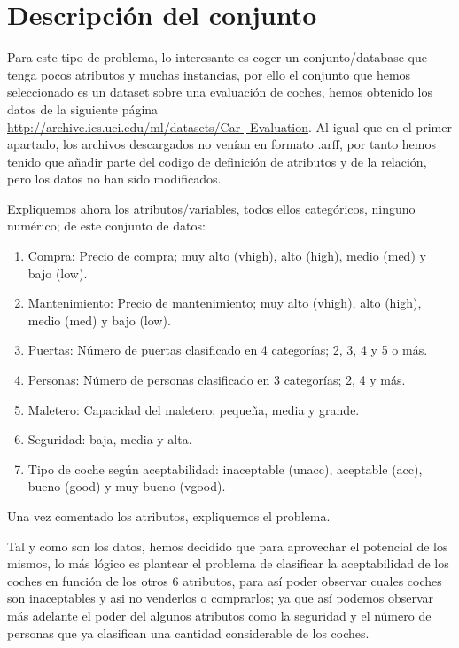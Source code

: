 \documentclass[a4paper, 11pt, twoside, openany, onecolumn, final]{memoir}
\begin{document}
		\section{Descripción del conjunto}
		Para este tipo de problema, lo interesante es coger un conjunto/database que tenga pocos atributos y muchas instancias, por ello el conjunto que hemos seleccionado es un dataset sobre una evaluación de coches, hemos obtenido los datos de la siguiente página \url{http://archive.ics.uci.edu/ml/datasets/Car+Evaluation}. Al igual que en el primer apartado, los archivos descargados no venían en formato .arff, por tanto hemos tenido que añadir parte del codigo de definición de atributos y de la relación, pero los datos no han sido modificados.
		
		Expliquemos ahora los atributos/variables, todos ellos categóricos, ninguno numérico; de este conjunto de datos:
	
	\begin{enumerate}
\item Compra: Precio de compra; muy alto (vhigh), alto (high), medio (med) y bajo (low).
\item Mantenimiento: Precio de mantenimiento; muy alto (vhigh), alto (high), medio (med) y bajo (low).
\item Puertas: Número de puertas clasificado en 4 categorías; 2, 3, 4 y 5 o más.
\item Personas: Número de personas clasificado en 3 categorías; 2, 4 y más.
\item Maletero: Capacidad del maletero; pequeña, media y grande.
\item Seguridad: baja, media y alta. 
\item Tipo de coche según aceptabilidad: inaceptable (unacc), aceptable (acc), bueno (good) y muy bueno (vgood). 
\end{enumerate}
		
		Una vez comentado los atributos, expliquemos el problema. 

Tal y como son los datos, hemos decidido que para aprovechar el potencial de los mismos, lo más lógico es plantear el problema de clasificar la aceptabilidad de los coches en función de los otros 6 atributos, para así poder observar cuales coches son inaceptables y asi no venderlos o comprarlos; ya que así podemos observar más adelante el poder del algunos atributos como la seguridad y el número de personas que ya clasifican una cantidad considerable de los coches.
\end{document}
